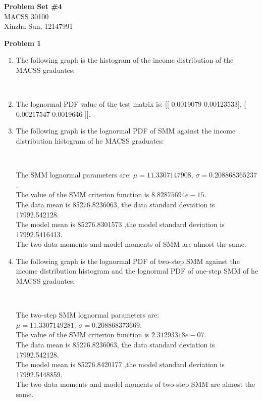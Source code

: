 \documentclass[letterpaper,12pt]{article}
\theoremstyle{definition}
\numberwithin{equation}{section}
\begin{document}
\begin{flushleft}
   \textbf{\Large{Problem Set \#4}} \\
   MACSS 30100 \\
   Xinzhu Sun, 12147991\\
\end{flushleft}

\noindent \textbf{\large Problem 1}\par

\begin{enumerate} [\bfseries (a)]
\item The following graph is the histogram of the income distribution of the MACSS graduates:\\
\begin{figure}[H]
\centering
{}\
\end{figure}\par

\item The lognormal PDF value of the test matrix is:  [[ 0.0019079   0.00123533], [ 0.00217547  0.0019646 ]]. 
	
\item The following graph is the lognormal PDF of SMM against the income distribution histogram of he MACSS graduates:
\begin{figure}[H]
\centering
{}\
\end{figure}\par
The SMM lognormal parameters are: \(\mu = 11.3307147908, \, \sigma = 0.208868365237\). \\
The value of the SMM criterion function is \(8.82875694e-15\).\\
The data mean is 85276.8236063, the data standard deviation is 17992.542128.\\
The model mean is  85276.8301573 ,the model standard deviation is 17992.5416413.\\
The two data moments and model moments of SMM are almost the same.\par	

\item The following graph is the lognormal PDF of two-step SMM against the income distribution histogram and the lognormal PDF of one-step SMM of he MACSS graduates:
\begin{figure}[H]
\centering
{}\
\end{figure}\par
The two-step SMM lognormal parameters are: \(\mu = 11.3307149281, \, \sigma = 0.208868373669\). \\
The value of the SMM criterion function is \(2.31293318e-07\).\\
The data mean is 85276.8236063, the data standard deviation is 17992.542128.\\
The model mean is  85276.8420177 ,the model standard deviation is 17992.5448859.\\
The two data moments and model moments of two-step SMM are almost the same.\par	

\end{enumerate}
\end{document}
